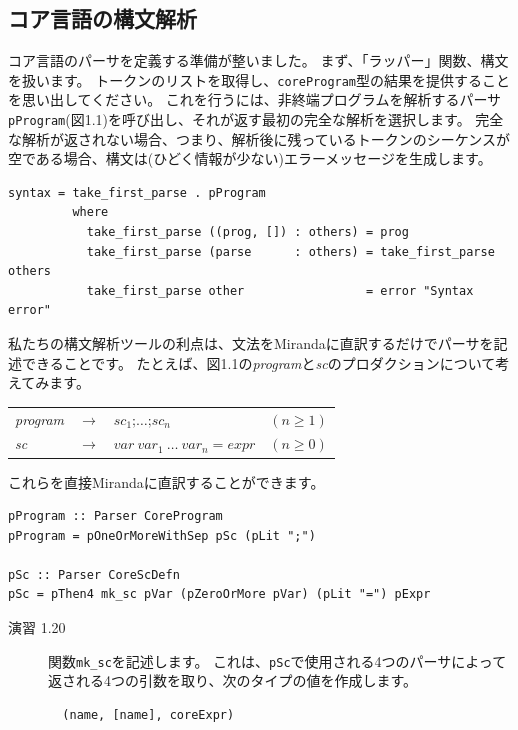 \documentclass{jbook}
\begin{document}
\subsection{コア言語の構文解析}

コア言語のパーサを定義する準備が整いました。
まず、「ラッパー」関数、構文を扱います。
トークンのリストを取得し、\texttt{coreProgram}型の結果を提供することを思い出してください。
これを行うには、非終端プログラムを解析するパーサ\texttt{pProgram}(図1.1)を呼び出し、それが返す最初の完全な解析を選択します。
完全な解析が返されない場合、つまり、解析後に残っているトークンのシーケンスが空である場合、構文は(ひどく情報が少ない)エラーメッセージを生成します。

\begin{verbatim}
syntax = take_first_parse . pProgram
         where
           take_first_parse ((prog, []) : others) = prog
           take_first_parse (parse      : others) = take_first_parse others
           take_first_parse other                 = error "Syntax error"
\end{verbatim}

私たちの構文解析ツールの利点は、文法をMirandaに直訳するだけでパーサを記述できることです。
たとえば、図1.1の\textit{program}と\textit{sc}のプロダクションについて考えてみます。

\begin{center}
	\begin{tabular} {l c l l}
		\textit{program} & $\rightarrow$ & $sc_1 \texttt{;} \ldots \texttt{;} sc_n$ & $(n \geq 1)$ \\
		\textit{sc}      & $\rightarrow$ & $var ~ var_1 ~ \ldots ~ var_n = expr$    & $(n \geq 0)$
	\end{tabular}
\end{center}

これらを直接Mirandaに直訳することができます。

\begin{verbatim}
pProgram :: Parser CoreProgram
pProgram = pOneOrMoreWithSep pSc (pLit ";")

pSc :: Parser CoreScDefn
pSc = pThen4 mk_sc pVar (pZeroOrMore pVar) (pLit "=") pExpr
\end{verbatim}

\begin{description}
	\item[演習 1.20] 関数\texttt{mk\_sc}を記述します。
		これは、\texttt{pSc}で使用される4つのパーサによって返される4つの引数を取り、次のタイプの値を作成します。
		\begin{verbatim}
  (name, [name], coreExpr)
\end{verbatim}
\end{description}
\end{document}
